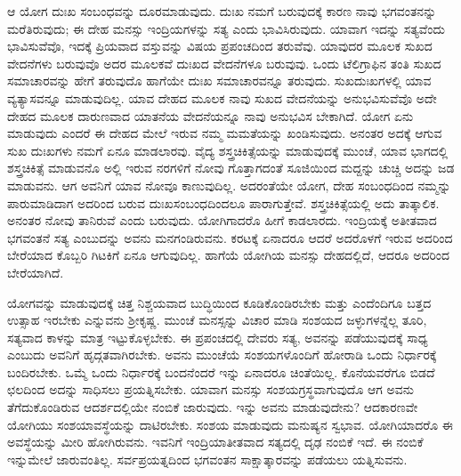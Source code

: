 ಆ ಯೋಗ ದುಃಖ ಸಂಬಂಧವನ್ನು ದೂರಮಾಡುವುದು. ದುಃಖ ನಮಗೆ ಬರುವುದಕ್ಕೆ ಕಾರಣ ನಾವು ಭಗವಂತನನ್ನು ಮರೆತಿರುವುದು; ಈ ದೇಹ ಮನಸ್ಸು ಇಂದ್ರಿಯಗಳನ್ನು ಸತ್ಯ ಎಂದು ಭಾವಿಸಿರುವುದು. ಯಾವಾಗ ಇದನ್ನು ಸತ್ಯವೆಂದು ಭಾವಿಸುವೆವೊ, ಇದಕ್ಕೆ ಪ್ರಿಯವಾದ ವಸ್ತುವನ್ನು ವಿಷಯ ಪ್ರಪಂಚದಿಂದ ತರುವೆವು. ಯಾವುದರ ಮೂಲಕ ಸುಖದ ವೇದನೆಗಳು ಬರುವುವೊ ಅದರ ಮೂಲಕವೆ ದುಃಖದ ವೇದನೆಗಳೂ ಬರುವುವು. ಒಂದು ಟೆಲಿಗ್ರಾಫಿನ ತಂತಿ ಸುಖದ ಸಮಾಚಾರವನ್ನು ಹೇಗೆ ತರುವುದೊ ಹಾಗೆಯೇ ದುಃಖ ಸಮಾಚಾರವನ್ನೂ ತರುವುದು. ಸುಖದುಃಖಗಳಲ್ಲಿ ಯಾವ ವ್ಯತ್ಯಾಸವನ್ನೂ ಮಾಡುವುದಿಲ್ಲ. ಯಾವ ದೇಹದ ಮೂಲಕ ನಾವು ಸುಖದ ವೇದನೆಯನ್ನು ಅನುಭವಿಸುವೆವೊ ಅದೇ ದೇಹದ ಮೂಲಕ ದಾರುಣವಾದ ಯಾತನೆಯ ವೇದನೆಯನ್ನೂ ನಾವು ಅನುಭವಿಸ ಬೇಕಾಗಿದೆ. ಯೋಗ ಏನು ಮಾಡುವುದು ಎಂದರೆ ಈ ದೇಹದ ಮೇಲೆ ಇರುವ ನಮ್ಮ ಮಮತೆಯನ್ನು ಖಂಡಿಸುವುದು. ಅನಂತರ ಅದಕ್ಕೆ ಆಗುವ ಸುಖ ದುಃಖಗಳು ನಮಗೆ ಏನೂ ಮಾಡಲಾರವು. ವೈದ್ಯ ಶಸ್ತ್ರಚಿಕಿತ್ಸೆಯನ್ನು ಮಾಡುವುದಕ್ಕೆ ಮುಂಚೆ, ಯಾವ ಭಾಗದಲ್ಲಿ ಶಸ್ತ್ರಚಿಕಿತ್ಸೆ ಮಾಡುವನೊ ಅಲ್ಲಿ ಇರುವ ನರಗಳಿಗೆ ನೋವು ಗೊತ್ತಾಗದಂತೆ ಸೂಜಿಯಿಂದ ಮದ್ದನ್ನು ಚುಚ್ಚಿ ಅದನ್ನು ಜಡ ಮಾಡುವನು. ಆಗ ಅವನಿಗೆ ಯಾವ ನೋವೂ ಕಾಣುವುದಿಲ್ಲ. ಅದರಂತೆಯೇ ಯೋಗ, ದೇಹ ಸಂಬಂಧದಿಂದ ನಮ್ಮನ್ನು ಪಾರುಮಾಡಿದಾಗ ಅದರಿಂದ ಬರುವ ದುಃಖಸಂಬಂಧದಿಂದಲೂ ಪಾರಾಗುತ್ತೇವೆ. ಶಸ್ತ್ರಚಿಕಿತ್ಸೆಯಲ್ಲಿ ಅದು ತಾತ್ಕಾಲಿಕ. ಅನಂತರ ನೋವು ತಾನಿರುವೆ ಎಂದು ಬರುವುದು. ಯೋಗಿಗಾದರೊ ಹೀಗೆ ಕಾಡಲಾರದು. ಇಂದ್ರಿಯಕ್ಕೆ ಅತೀತವಾದ ಭಗವಂತನೆ ಸತ್ಯ ಎಂಬುದನ್ನು ಅವನು ಮನಗಂಡಿರುವನು. ಕರಟಕ್ಕೆ ಏನಾದರೂ ಆದರೆ ಅದರೊಳಗೆ ಇರುವ ಅದರಿಂದ ಬೇರೆಯಾದ ಕೊಬ್ಬರಿ ಗಿಟಕಿಗೆ ಏನೂ ಆಗುವುದಿಲ್ಲ. ಹಾಗೆಯೆ ಯೋಗಿಯ ಮನಸ್ಸು ದೇಹದಲ್ಲಿದೆ, ಆದರೂ ಅದರಿಂದ ಬೇರೆಯಾಗಿದೆ.

ಯೋಗವನ್ನು ಮಾಡುವುದಕ್ಕೆ ಚಿತ್ತ ನಿಶ್ಚಯವಾದ ಬುದ್ಧಿಯಿಂದ ಕೂಡಿಕೊಂಡಿರಬೇಕು ಮತ್ತು ಎಂದೆಂದಿಗೂ ಬತ್ತದ ಉತ್ಸಾಹ ಇರಬೇಕು ಎನ್ನುವನು ಶ‍್ರೀಕೃಷ್ಣ. ಮುಂಚೆ ಮನಸ್ಸನ್ನು ವಿಚಾರ ಮಾಡಿ ಸಂಶಯದ ಜಳ್ಳುಗಳನ್ನೆಲ್ಲ ತೂರಿ, ಸತ್ಯವಾದ ಕಾಳನ್ನು ಮಾತ್ರ ಇಟ್ಟುಕೊಳ್ಳಬೇಕು. ಈ ಪ್ರಪಂಚದಲ್ಲಿ ದೇವರು ಸತ್ಯ, ಅವನನ್ನು ಪಡೆಯುವುದಕ್ಕೆ ಸಾಧ್ಯ ಎಂಬುದು ಅವನಿಗೆ ಹೃದ್ಗತವಾಗಿರಬೇಕು. ಅವನು ಮುಂಚೆಯೆ ಸಂಶಯಗಳೊಂದಿಗೆ ಹೋರಾಡಿ ಒಂದು ನಿರ್ಧಾರಕ್ಕೆ ಬಂದಿರಬೇಕು. ಒಮ್ಮೆ ಒಂದು ನಿರ್ಧಾರಕ್ಕೆ ಬಂದನೆಂದರೆ ಇನ್ನು ಏನಾದರೂ ಚಿಂತೆಯಿಲ್ಲ. ಕೊನೆಯವರೆಗೂ ಬಿಡದೆ ಛಲದಿಂದ ಅದನ್ನು ಸಾಧಿಸಲು ಪ್ರಯತ್ನಿಸಬೇಕು. ಯಾವಾಗ ಮನಸ್ಸು ಸಂಶಯಗ್ರಸ್ಥವಾಗುವುದೊ ಆಗ ಅವನು ತೆಗೆದುಕೊಂಡಿರುವ ಆದರ್ಶದಲ್ಲಿಯೇ ನಂಬಿಕೆ ಜಾರುವುದು. ಇನ್ನು ಅವನು ಮಾಡುವುದೇನು? ಆದಕಾರಣವೇ ಯೋಗಿಯು ಸಂಶಯಾವಸ್ಥೆಯನ್ನು ದಾಟಿರಬೇಕು. ಸಂಶಯ ಮಾಡುವುದು ಮನುಷ್ಯನ ಸ್ವಭಾವ. ಯೋಗಿಯಾದರೊ ಈ ಅವಸ್ಥೆಯನ್ನು ಮೀರಿ ಹೋಗಿರುವನು. ಇವನಿಗೆ ಇಂದ್ರಿಯಾತೀತವಾದ ಸತ್ಯದಲ್ಲಿ ದೃಢ ನಂಬಿಕೆ ಇದೆ. ಈ ನಂಬಿಕೆ ಇನ್ನುಮೇಲೆ ಜಾರುವಂತಿಲ್ಲ. ಸರ್ವಪ್ರಯತ್ನದಿಂದ ಭಗವಂತನ ಸಾಕ್ಷಾತ್ಕಾರವನ್ನು ಪಡೆಯಲು ಯತ್ನಿಸುವನು.

